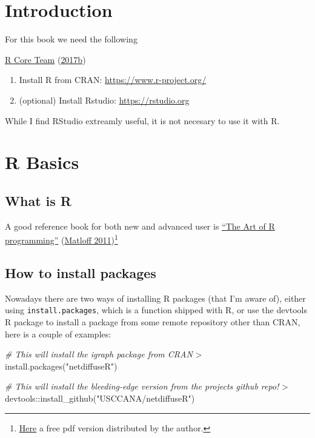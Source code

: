 \documentclass[
]{book}
\newenvironment{Shaded}{\begin{snugshade}}{\end{snugshade}}
\newcommand{\CommentTok}[1]{\textcolor[rgb]{0.56,0.35,0.01}{\textit{#1}}}
\newcommand{\FunctionTok}[1]{\textcolor[rgb]{0.00,0.00,0.00}{#1}}
\newcommand{\NormalTok}[1]{#1}
\newcommand{\SpecialCharTok}[1]{\textcolor[rgb]{0.00,0.00,0.00}{#1}}
\newcommand{\StringTok}[1]{\textcolor[rgb]{0.31,0.60,0.02}{#1}}
\begin{document}
\hypertarget{introduction}{%
\chapter{Introduction}\label{introduction}}

For this book we need the following

\protect\hyperlink{ref-R}{R Core Team} (\protect\hyperlink{ref-R}{2017b})

\begin{enumerate}
\def\labelenumi{\arabic{enumi}.}
\item
  Install R from CRAN: \url{https://www.r-project.org/}
\item
  (optional) Install Rstudio: \url{https://rstudio.org}
\end{enumerate}

While I find RStudio extreamly useful, it is not necesary to use it with R.

\hypertarget{r-basics}{%
\chapter{R Basics}\label{r-basics}}

\hypertarget{what-is-r}{%
\section{What is R}\label{what-is-r}}

A good reference book for both new and advanced user is \href{https://nostarch.com/artofr.htm}{``The Art of R programming''} (\protect\hyperlink{ref-Matloff2011}{Matloff 2011})\footnote{\href{http://heather.cs.ucdavis.edu/~matloff/145/PLN/RMaterials/NSPpart.pdf}{Here} a free pdf version distributed by the author.}

\hypertarget{how-to-install-packages}{%
\section{How to install packages}\label{how-to-install-packages}}

Nowadays there are two ways of installing R packages (that I'm aware of), either using \texttt{install.packages}, which is a function shipped with R, or use the devtools R package to install a package from some remote repository other than CRAN, here is a couple of examples:

\begin{Shaded}
\begin{Highlighting}[]
\CommentTok{\# This will install the igraph package from CRAN}
\SpecialCharTok{\textgreater{}} \FunctionTok{install.packages}\NormalTok{(}\StringTok{"netdiffuseR"}\NormalTok{)}

\CommentTok{\# This will install the bleeding{-}edge version from the project\textquotesingle{}s github repo!}
\SpecialCharTok{\textgreater{}}\NormalTok{ devtools}\SpecialCharTok{::}\FunctionTok{install\_github}\NormalTok{(}\StringTok{"USCCANA/netdiffuseR"}\NormalTok{)}
\end{Highlighting}
\end{Shaded}
\end{document}
